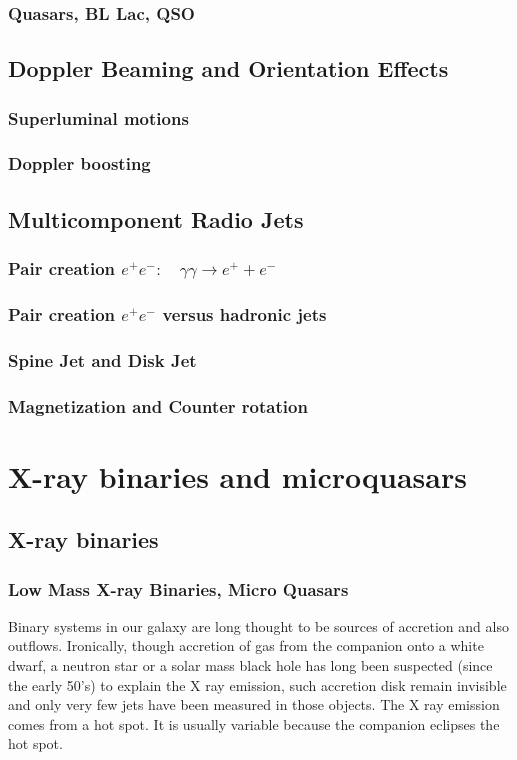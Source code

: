 \documentclass[10pt,a4paper,english]{article}
\begin{document}
\subsubsection{Quasars, BL Lac, QSO}
\subsection{Doppler Beaming and Orientation Effects}
\subsubsection{Superluminal motions}
\subsubsection{Doppler boosting}
\subsection{Multicomponent Radio Jets}
\subsubsection{\texorpdfstring{Pair creation $e^+ e^-: \quad \gamma\gamma \rightarrow e^+ + e^-$}{Pair creation e⁺e⁻: γγ → e⁺ + e⁻}}
\subsubsection{\texorpdfstring{Pair creation $e^+ e^-$ versus hadronic jets}{Pair creation e⁺e⁻ versus hadronic jets}}
\subsubsection{Spine Jet and Disk Jet}
\subsubsection{Magnetization and Counter rotation}


\section{X-ray binaries and microquasars}
\subsection{X-ray binaries}
\subsubsection{Low Mass X-ray Binaries, Micro Quasars}
Binary systems in our galaxy are long thought to be sources of accretion and also outflows. Ironically, though accretion of gas from the companion onto a white dwarf, a neutron star or a solar mass black hole has long been suspected (since the early 50's) to explain the X ray emission, such accretion disk remain invisible and only very few jets have been measured in those objects. The X ray emission comes from a hot spot. It is usually variable because the companion eclipses the hot spot.
\end{document}
